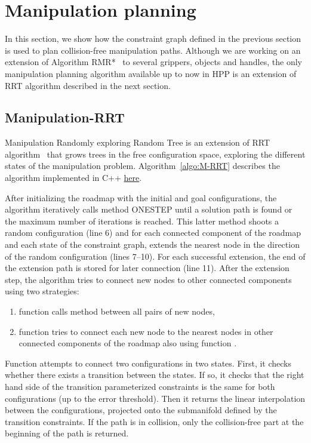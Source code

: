 \section{Manipulation planning}\label{sec:manipulation-planning}

In this section, we show how the constraint graph defined in the previous section is used to plan collision-free manipulation paths. Although we are working on an extension of Algorithm RMR*~\cite{schmitt17icra} to several grippers, objects and handles, the only manipulation planning algorithm available up to now in HPP is an extension of RRT algorithm described in the next section.

\subsection{Manipulation-RRT}

Manipulation Randomly exploring Random Tree is an extension of RRT algorithm~\cite{LavKuf01b} that grows trees in the free configuration space, exploring the different states of the manipulation problem. Algorithm~\ref{algo:M-RRT} describes the algorithm implemented in C++ \href{https://github.com/humanoid-path-planner/hpp-manipulation/blob/16369aa291ab1b17ef6176ae8b8b2512b5e6fff7/src/manipulation-planner.cc#L159}{here}.

After initializing the roadmap with the initial and goal configurations, the algorithm iteratively calls method {\scriptsize ONE}{\small S}{\scriptsize TEP} until a solution path is found or the maximum number of iterations is reached.
This latter method shoots a random configuration (line 6) and for each connected component of the roadmap and each state of the constraint graph, extends the nearest node in the direction of the random configuration (lines 7--10). For each successful extension, the end of the extension path is stored for later connection (line 11). After the extension step, the algorithm tries to connect new nodes to other connected components using two strategies:
\begin{enumerate}
\item function \TRYCONNECTNEWNODES calls method \CONNECT between all pairs of new nodes,
\item function \TRYCONNECTTOROADMAP tries to connect each new node to the nearest nodes in other connected components of the roadmap also using function \CONNECT.
\end{enumerate}
Function \CONNECT attempts to connect two configurations in two states. First, it checks whether there exists a transition between the states. If so, it checks that the right hand side of the transition parameterized constraints is the same for both configurations (up to the error threshold). Then it returns the linear interpolation between the configurations, projected onto the submanifold defined by the transition constraints. If the path is in collision, only the collision-free part at the beginning of the path is returned.

